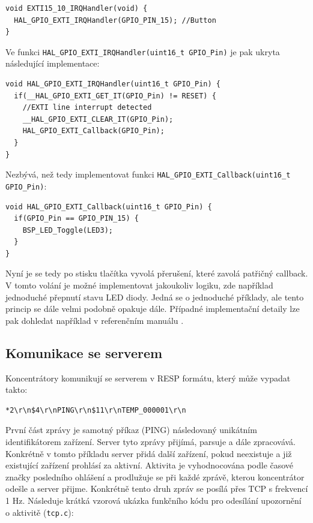 \begin{verbatim}
void EXTI15_10_IRQHandler(void) {
  HAL_GPIO_EXTI_IRQHandler(GPIO_PIN_15); //Button
}
\end{verbatim}

Ve funkci \texttt{HAL\_GPIO\_EXTI\_IRQHandler(uint16\_t GPIO\_Pin)} je pak u\-kry\-ta následující implementace:

\begin{verbatim}
void HAL_GPIO_EXTI_IRQHandler(uint16_t GPIO_Pin) {
  if(__HAL_GPIO_EXTI_GET_IT(GPIO_Pin) != RESET) {
    //EXTI line interrupt detected
    __HAL_GPIO_EXTI_CLEAR_IT(GPIO_Pin);
    HAL_GPIO_EXTI_Callback(GPIO_Pin);
  }
}
\end{verbatim}

Nezbývá, než tedy implementovat funkci \texttt{HAL\_GPIO\_EXTI\_Callback(uint16\_t GPIO\_Pin)}:

\begin{verbatim}
void HAL_GPIO_EXTI_Callback(uint16_t GPIO_Pin) {
  if(GPIO_Pin == GPIO_PIN_15) {
    BSP_LED_Toggle(LED3);
  }
}
\end{verbatim}

Nyní je se tedy po stisku tlačítka vyvolá přerušení, které zavolá patřičný callback. V tomto volání je možné implementovat jakoukoliv logiku, zde například jednoduché přepnutí stavu LED diody. Jedná se o jednoduché příklady, ale tento princip se dále velmi podobně opakuje dále. Případné implementační detaily lze pak dohledat například v referenčním manuálu \cite{manual}.

\subsection{Komunikace se serverem}
Koncentrátory komunikují se serverem v RESP  formátu, který může vypadat takto:

\begin{verbatim}
*2\r\n$4\r\nPING\r\n$11\r\nTEMP_000001\r\n
\end{verbatim}

První část zprávy je samotný příkaz (PING) následovaný unikátním identifikátorem zařízení. Server tyto zprávy přijímá, parsuje a dále zpracovává. Konkrétně v tomto příkladu server přidá další zařízení, pokud neexistuje a již existující zařízení prohlásí za aktivní. Aktivita je vyhodnocována podle časové značky posledního ohlášení a prodlužuje se při každé zprávě, kterou koncentrátor odešle a server přijme. Konkrétně tento druh zpráv se posílá přes TCP s frekvencí 1 Hz. Následuje krátká vzorová ukázka funkčního kódu pro odesílání upozornění o aktivitě (\texttt{tcp.c}):

